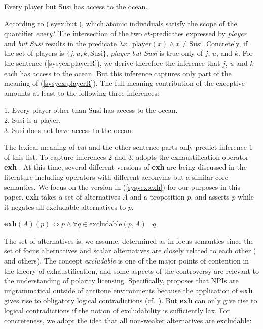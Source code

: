 \documentclass[output=paper,colorlinks,citecolor=brown,
]{langscibook}
\let\l\lambda
\def\refp#1{(\ref{sy#1})}
\begin{document}
\ea \label{syex:playerR} 
   Every player but Susi has access to the ocean.\z

According to (\ref{syex:but}), which atomic individuals satisfy the scope of the quantifier \emph{every}?
The intersection of the two $et$-predicates expressed by \emph{player} and \emph{but Susi} results in the predicate $\l x\ .\ \text{player}(x) \wedge x \neq \text{Susi}$.
Concretely, if the set of players is $\{j, u, k, \text{Susi}\}$, \emph{player but Susi} is true only of $j$, $u$, and $k$.  
For the sentence \refp{syex:playerR}, we derive therefore the inference that $j$, $u$ and $k$ each has access to the ocean.
But this inference captures only part of the meaning of \refp{syex:playerR}.
The full meaning contribution of the exceptive amounts at least to the following three inferences:

\ea \label{syex:inferences}
    1. Every player other than Susi has access to the ocean.\\
    2. Susi is a player.\\
    3. Susi does not have access to the ocean. \z

The lexical meaning of \emph{but} and the other sentence parts only predict inference 1 of this list.
To capture inferences 2 and 3, \cite{hirsch16b} adopts the exhaustification operator \textbf{exh} \citep{chierchia13a,fox07b}.
At this time, several different versions of \textbf{exh} are being discussed in the literature including operators with different acronyms but a similar core semantics.
We focus on the version in \refp{syex:exh} for our purposes in this paper.
\textbf{exh} takes a set of alternatives $A$ and a proposition $p$, and asserts $p$ while it negates all excludable alternatives to $p$.

\ea \label{syex:exh}
\textbf{exh}$(A)(p) \Leftrightarrow p \land \forall q \in \text{excludable}(p,A) \ \neg q$\z

The set of alternatives is, we assume, determined as in focus semantics since the set of focus alternatives and scalar alternatives are closely related to each other (\citealt{gotzner19a} and others).
The concept \emph{excludable} is one of the major points of contention in the theory of exhaustification, and some aspects of the controversy are relevant to the understanding of polarity licensing.
Specifically, \cite{chierchia13a} proposes that NPIs are ungrammatical outside of antitone environments because the application of \textbf{exh} gives rise to obligatory logical contradictions (cf.\ \citealt{crnic14a}).
But \textbf{exh} can only give rise to logical contradictions if the notion of excludability is sufficiently lax.
For concreteness, we adopt the idea that all non-weaker alternatives are excludable:
\end{document}
